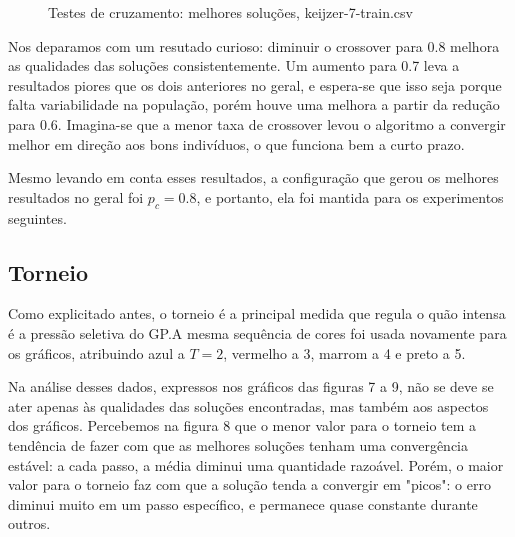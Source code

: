 \documentclass[11pt]{article}
\begin{document}
\begin{figure}[!ht]
	\centering
    \caption{Testes de cruzamento: melhores soluções, keijzer-7-train.csv}
    \label{fig:data}
\end{figure}

Nos deparamos com um resutado curioso: diminuir o crossover para 0.8 melhora as qualidades das soluções consistentemente. Um aumento para 0.7 leva a resultados piores que os dois anteriores no geral, e espera-se que isso seja porque falta variabilidade na população, porém houve uma melhora a partir da redução para 0.6. Imagina-se que a menor taxa de crossover levou o algoritmo a convergir melhor em direção aos bons indivíduos, o que funciona bem a curto prazo.

Mesmo levando em conta esses resultados, a configuração que gerou os melhores resultados no geral foi $p_c = 0.8$, e portanto, ela foi mantida para os experimentos seguintes.

\subsection{Torneio}

Como explicitado antes, o torneio é a principal medida que regula o quão intensa é a pressão seletiva do GP.A mesma sequência de cores foi usada novamente para os gráficos, atribuindo azul a $T = 2$, vermelho a 3, marrom a 4 e preto a 5.

Na análise desses dados, expressos nos gráficos das figuras 7 a 9, não se deve se ater apenas às qualidades das soluções encontradas, mas também aos aspectos dos gráficos. Percebemos na figura 8 que o menor valor para o torneio tem a tendência de fazer com que as melhores soluções tenham uma convergência estável: a cada passo, a média diminui uma quantidade razoável. Porém, o maior valor para o torneio faz com que a solução tenda a convergir em "picos": o erro diminui muito em um passo específico, e permanece quase constante durante outros.
\end{document}
